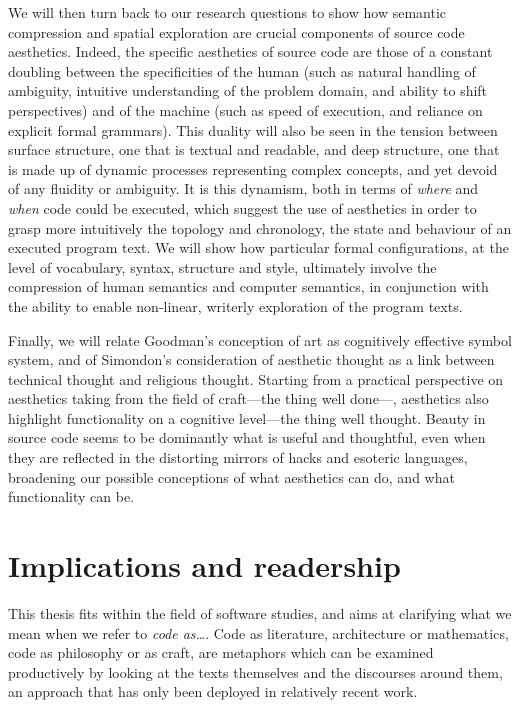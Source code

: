We will then turn back to our research questions to show how semantic compression and spatial exploration are crucial components of source code aesthetics. Indeed, the specific aesthetics of source code are those of a constant doubling between the specificities of the human (such as natural handling of ambiguity, intuitive understanding of the problem domain, and ability to shift perspectives) and of the machine (such as speed of execution, and reliance on explicit formal grammars). This duality will also be seen in the tension between surface structure, one that is textual and readable, and deep structure, one that is made up of dynamic processes representing complex concepts, and yet devoid of any fluidity or ambiguity. It is this dynamism, both in terms of \emph{where} and \emph{when} code could be executed, which suggest the use of aesthetics in order to grasp more intuitively the topology and chronology, the state and behaviour of an executed program text. We will show how particular formal configurations, at the level of vocabulary, syntax, structure and style, ultimately involve the compression of human semantics and computer semantics, in conjunction with the ability to enable non-linear, writerly exploration of the program texts.

Finally, we will relate Goodman's conception of art as cognitively effective symbol system, and of Simondon's consideration of aesthetic thought as a link between technical thought and religious thought. Starting from a practical perspective on aesthetics taking from the field of craft—the thing well done—, aesthetics also highlight functionality on a cognitive level—the thing well thought. Beauty in source code seems to be dominantly what is useful and thoughtful, even when they are reflected in the distorting mirrors of hacks and esoteric languages, broadening our possible conceptions of what aesthetics can do, and what functionality can be.

\section{Implications and readership}
\label{sec:implications-readership}

This thesis fits within the field of software studies, and aims at clarifying what we mean when we refer to \emph{code as\dots}. Code as literature, architecture or mathematics, code as philosophy or as craft, are metaphors which can be examined productively by looking at the texts themselves and the discourses around them, an approach that has only been deployed in relatively recent work.

